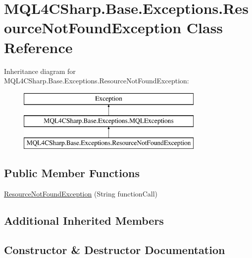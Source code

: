 \hypertarget{class_m_q_l4_c_sharp_1_1_base_1_1_exceptions_1_1_resource_not_found_exception}{}\section{M\+Q\+L4\+C\+Sharp.\+Base.\+Exceptions.\+Resource\+Not\+Found\+Exception Class Reference}
\label{class_m_q_l4_c_sharp_1_1_base_1_1_exceptions_1_1_resource_not_found_exception}
Inheritance diagram for M\+Q\+L4\+C\+Sharp.\+Base.\+Exceptions.\+Resource\+Not\+Found\+Exception\+:\begin{figure}[H]
\begin{center}
\leavevmode
\includegraphics[height=3.000000cm]{class_m_q_l4_c_sharp_1_1_base_1_1_exceptions_1_1_resource_not_found_exception}
\end{center}
\end{figure}
\subsection*{Public Member Functions}
\begin{DoxyCompactItemize}
\item 
\hyperlink{class_m_q_l4_c_sharp_1_1_base_1_1_exceptions_1_1_resource_not_found_exception_a3e3576056f0db4b3e937b2d922f04549}{Resource\+Not\+Found\+Exception} (String function\+Call)
\end{DoxyCompactItemize}
\subsection*{Additional Inherited Members}


\subsection{Constructor \& Destructor Documentation}
